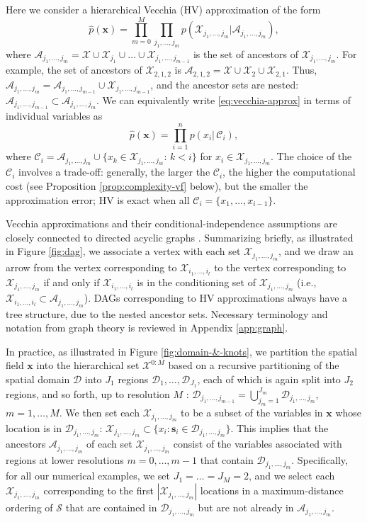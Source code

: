 \documentclass[12pt,letterpaper]{article}
\theoremstyle{propstyle}
\theoremstyle{propstyle}
\theoremstyle{propstyle}
\theoremstyle{propstyle}
\theoremstyle{propstyle}
\newcommand{\bs}{\mathbf{s}}
\newcommand{\bx}{\mathbf{x}}
\newcommand{\sx}{\mathcal{X}}
\newcommand{\sa}{\mathcal{A}}
\newcommand{\condset}{\mathcal{C}}
\newcommand{\domain}{\mathcal{D}}
\newcommand{\locs}{\mathcal{S}}
\newcommand{\il}{{i_1,\ldots,i_l}}
\newcommand{\jm}{{j_1,\ldots,j_m}}
\newcommand{\jmm}{{j_1,\ldots,j_{m-1}}}
\begin{document}
Here we consider a hierarchical Vecchia (HV) approximation of the form
\begin{equation}
\textstyle \hat{p}(\bx) = \prod_{m=0}^M \prod_\jm p(\sx_\jm|\sa_\jm),
\label{eq:vecchia-approx}
\end{equation}
where $\sa_\jm = \sx \cup \sx_{j_1} \cup \ldots \cup \sx_{\jmm}$ is the set of ancestors of $\sx_\jm$. For example, the set of ancestors of $\sx_{2,1,2}$ is $\sa_{2,1,2} = \sx \cup \sx_2 \cup \sx_{2,1}$. Thus, $\sa_\jm = \sa_\jmm \cup \sx_\jmm$, and the ancestor sets are nested: $\sa_\jmm \subset \sa_\jm$. We can equivalently write \eqref{eq:vecchia-approx} in terms of individual variables as
\begin{equation}
\textstyle \hat{p}(\bx) = \prod_{i=1}^n p(x_i|\,\condset_i),
\label{eq:vecchia-approx-ind}
\end{equation}
where $\condset_i = \sa_\jm \cup \{x_k \in \sx_\jm \! : \, k<i \}$ for $x_i \in \sx_\jm$. The choice of the $\condset_i$ involves a trade-off: generally, the larger the $\condset_i$, the higher the computational cost (see Proposition \ref{prop:complexity-vf} below), but the smaller the approximation error; HV is exact when all $\condset_i = \{x_1,\ldots,x_{i-1}\}$.

Vecchia approximations and their conditional-independence assumptions are closely connected to directed acyclic graphs \citep[DAGs;][]{Datta2016,Katzfuss2017a}. Summarizing briefly, as illustrated in Figure \ref{fig:dag}, we associate a vertex with each set $\sx_\jm$, and we draw an arrow from the vertex corresponding to $\sx_{\il}$ to the vertex corresponding to $\sx_\jm$ if and only if $\sx_{\il}$ is in the conditioning set of $\sx_\jm$ (i.e., $\sx_{\il} \subset \sa_\jm$). DAGs corresponding to HV approximations always have a tree structure, due to the nested ancestor sets. Necessary terminology and notation from graph theory is reviewed in Appendix \ref{app:graph}.

In practice, as illustrated in Figure \ref{fig:domain-&-knots}, we partition the spatial field $\bx$ into the hierarchical set $\sx^{0:M}$ based on a recursive partitioning of the spatial domain $\domain$ into $J_1$ regions $\domain_{1},\ldots,\domain_{J_1}$, each of which is again split into $J_2$ regions, and so forth, up to resolution $M$ \citep{Katzfuss2015}: $\domain_\jmm = \bigcup_{j_m=1}^{J_m} \domain_\jm$, $m=1,\ldots,M$.
We then set each $\sx_\jm$ to be a subset of the variables in $\bx$ whose location is in $\domain_\jm$: $\sx_\jm \subset \{x_i: \bs_i \in \domain_\jm\}$. This implies that the ancestors $\sa_\jm$ of each set $\sx_\jm$ consist of the variables associated with regions at lower resolutions $m=0,\ldots,m-1$ that contain $\domain_\jm$.
Specifically, for all our numerical examples, we set $J_1=\ldots=J_M=2$, and we select each $\sx_\jm$ corresponding to the first $|\sx_\jm|$ locations in a maximum-distance ordering \citep{Guinness2016a,Schafer2017} of $\locs$ that are contained in $\domain_\jm$ but are not already in $\sa_\jm$.
\end{document}
